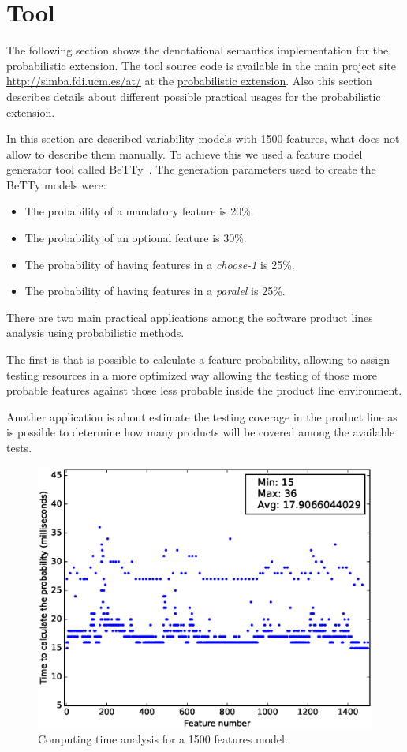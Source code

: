 
\section{Tool}
\label{sec:stat:impl}

The following section shows the denotational semantics
implementation for the probabilistic extension.
The tool source code is available in the
main project site \url{http://simba.fdi.ucm.es/at/} at the
\href{http://simba.fdi.ucm.es/at/probabilistic/implementation_splap.tar}{probabilistic extension}.
Also this section describes details about different possible
practical usages for the probabilistic extension.

In this section are described variability models with 1500
features, what does not allow to describe them manually.
To achieve this we used a feature model generator tool 
called BeTTy~\cite{SeguraHBC11}.
The generation parameters used to create the BeTTy models were:

\begin{itemize}
	\item The probability of a mandatory feature is 20\%.
	\item The probability of an optional feature is 30\%.
	\item The probability of having features in a \emph{choose-1} is 25\%.
	\item The probability of having features in a \emph{paralel} is 25\%.
\end{itemize}

There are two main practical applications among
the software product lines analysis using probabilistic methods.

The first is that is possible to calculate a
feature probability, allowing to assign
testing resources in a more optimized way allowing
the testing of those more probable features against
those less probable inside the product line
environment.

Another application is about estimate the testing
coverage in the product line as is possible to
determine how many products will be covered among the
available tests.

\begin{figure}[h]
	\centering
	\linefigure
	\includegraphics[width=0.8\hsize,angle=0]{plot_probs_times.eps}
	\linefigure
	\caption{Computing time analysis for a 1500 features model.}\label{fig:plot:probs:times}
\end{figure}

